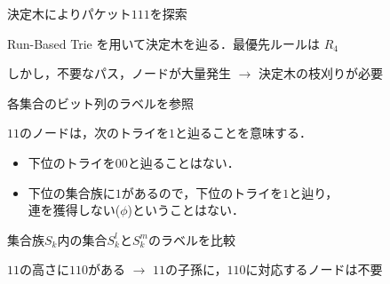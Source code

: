 \documentclass[12pt,dvipdfmx,mathserif,uplatex,aspectratio=32]{beamer}
\begin{document}




\begin{frame}{決定木によりパケット$111$を探索}
 \centering{
  \scalebox{0.8}{}
 }
 \par

Run-Based Trie を用いて決定木を辿る．最優先ルールは $R_{4}$\\
\vspace{3mm}

しかし，不要なパス，ノードが大量発生 $\rightarrow$ {\color{red}決定木の枝刈り}が必要
\end{frame}


\begin{frame}{各集合のビット列のラベルを参照}

 {\centering

  \scalebox{0.8}{}

 }

\vspace{5mm}
{\centering
$11$のノードは，次のトライを$1$と辿ることを意味する．
}

{\centering

\begin{itemize}
 \item 下位のトライを$00$と辿ることはない．
 \item 下位の集合族に$1$があるので，下位のトライを$1$と辿り，\\ \vspace{1mm} 連を獲得しない($\phi$)ということはない．
\end{itemize}

}
\end{frame}

\begin{frame}{集合族$S_{k}$内の集合$S_{k}^{l}$と$S_{k}^{m}$のラベルを比較}

 {\centering

  \scalebox{0.8}{}

 }

\vspace{3mm}

{\centering
$11$の高さに$110$がある $\rightarrow$ $11$の子孫に，$110$に対応するノードは不要 \\
\vspace{3mm}
}


\end{frame}
\end{document}
